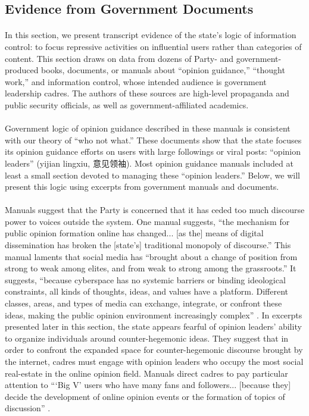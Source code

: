 \documentclass[12pt]{article}
\begin{document}
\begin{CJK*}{UTF8}{gbsn}
\subsection{Evidence from Government Documents}

\paragraph{} In this section, we present transcript evidence of the state's logic of information control: to focus repressive activities on influential users rather than categories of content. This section draws on data from dozens of Party- and government-produced books, documents, or manuals about ``opinion guidance,'' ``thought work,'' and information control, whose intended audience is government leadership cadres. The authors of these sources are high-level propaganda and public security officials, as well as government-affiliated academics.
\paragraph{} Government logic of opinion guidance described in these manuals is consistent with our theory of ``who not what.'' These documents show that the state focuses its opinion guidance efforts on users with large followings or viral posts: ``opinion leaders'' (yijian lingxiu, 意见领袖). Most opinion guidance manuals included at least a small section devoted to managing these ``opinion leaders.'' Below, we will present this logic using excerpts from government manuals and documents.
\paragraph{} Manuals suggest that the Party is concerned that it has ceded too much discourse power to voices outside the system. One manual suggests, ``the mechanism for public opinion formation online has changed... [as the] means of digital dissemination has broken the [state's] traditional monopoly of discourse.'' This manual laments that social media has ``brought about a change of position from strong to weak among elites, and from weak to strong among the grassroots.'' It suggests,  ``because cyberspace has no systemic barriers or binding ideological constraints, all kinds of thoughts, ideas, and values have a platform. Different classes, areas, and types of media can exchange, integrate, or confront these ideas, making the public opinion environment increasingly complex'' \citep[118-122]{zhou2011weibo}. In excerpts presented later in this section, the state appears fearful of opinion leaders' ability to organize individuals around counter-hegemonic ideas. They suggest that in order to confront the expanded space for counter-hegemonic discourse brought by the internet, cadres must engage with opinion leaders who occupy the most social real-estate in the online opinion field. Manuals direct cadres to pay particular attention to ```Big V' users who have many fans and followers... [because they] decide the development of online opinion events or the formation of topics of discussion'' \cite[180-194]{zeng2015wangluo}.

\end{CJK*}
\end{document}
